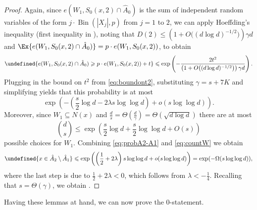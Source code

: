 \documentclass[reqno,a4paper,11pt]{amsart}
\theoremstyle{definition}
\newcommand{\Bin}{\operatorname{Bin}}
\renewcommand{\leq}{\leqslant}
\renewcommand{\geq}{\geqslant}
\let\Pr\undefined
\begin{document}
\begin{proof}
  Again, since $e(W_1,S_0(x,2) \cap \hat{A}_0)$ is the sum of independent random variables of the form $j \cdot \Bin(|X_j|,p)$ from $j=1$ to $2$, we can apply Hoeffding's inequality (first inequality in ), noting that $D(2) \leq \left(1+O\big((d \log d)^{-1/2}\big)\right) \gamma d$ and $\Ex{e(W_1, S_0(x, 2) \cap \hat{A}_0)}=p \cdot e(W_1, S_0(x, 2))$, to obtain
  \[
    \Pr{e(W_1, S_0(x, 2) \cap \hat{A}_0) \geq p \cdot e(W_1, S_0(x, 2)) +t} \leq \exp\left(-\frac{2t^2}{\left(1+O\big((d \log d)^{-1/2}\big)\right) \gamma d}\right).
  \]
  Plugging in the bound on $t^2$ from \eqref{eq:boundont2}, substituting $\gamma = s+7K$ and simplifying yields that this probability is at most
  \begin{equation}\label{eq:probA2-A1}
    \exp\left(-\left(\frac{s}{2} \log d -2 \lambda s \log \log d\right) + o(s \log \log d)\right).
  \end{equation}
  Moreover, since $W_1 \subseteq N(x)$ and $\frac{d}{s}= \Theta\left(\frac{d}{\gamma}\right)=\Theta(\sqrt{d \log d})$ there are at most
  \begin{equation}\label{eq:countW}
    \binom{d}{s} \leq \exp\left(\frac{s}{2} \log d + \frac{s}{2} \log \log d +O(s)\right)
  \end{equation}
  possible choices for $W_1$.
  Combining \eqref{eq:probA2-A1} and \eqref{eq:countW} we obtain
  \[
    \Pr{x \in \hat{A}_2 \setminus \hat{A}_1} \leq \exp\left(\left(\frac{1}{2}+2\lambda\right) s \log \log d + o(s \log \log d)\right) = \exp(-\Omega(s \log \log d)),
  \]
  where the last step is due to $\frac{1}{2}+2 \lambda <0$, which follows from $\lambda <-\frac{1}{4}$.
  Recalling that $s=\Theta(\gamma)$, we obtain .
\end{proof}

Having these lemmas at hand, we can now prove the $0$-statement.
\end{document}
